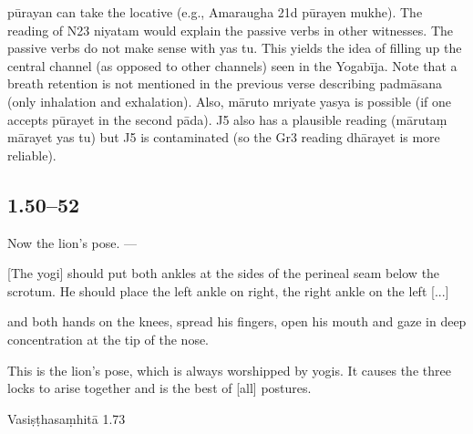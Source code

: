 \begin{ekdosis}
\begin{testimonia}[hp01_049]
\end{testimonia}

\begin{philcomm}[hp01_049]
pūrayan can take the locative (e.g., Amaraugha 21d pūrayen mukhe).  The reading of N23 niyatam would explain the passive verbs in other witnesses. The passive verbs do not make sense with yas tu. This yields the idea of filling up the central channel (as opposed to other channels) seen in the Yogabīja. Note that a breath retention is not mentioned in the previous verse describing padmāsana (only inhalation and exhalation). 
Also,  māruto mriyate yasya is possible (if one  accepts pūrayet in the second pāda).  J5 also has a plausible reading (mārutaṃ mārayet yas tu) but J5 is contaminated (so the Gr3 reading dhārayet is more reliable).
\end{philcomm}

\subsection*{1.50--52}
\begin{translation}[hp01_050]
Now the lion’s pose. ---

[The yogi] should put both ankles at the sides of the perineal seam below the scrotum. He should place the left ankle on right, the right ankle on the left [...]
\end{translation}

\begin{translation}[hp01_051]
[...] and both hands on the knees, spread his fingers, open his mouth and gaze in deep concentration at the tip of the nose.
\end{translation}

\begin{translation}[hp01_052]
This is the lion’s pose, which is always worshipped by yogis. It causes the three locks to arise together and is the best of [all] postures.
\end{translation}

\begin{sources}[hp01_050]
Vasiṣṭhasaṃhitā 1.73

\begin{versinnote}
\end{versinnote}


\end{sources}
\end{ekdosis}

